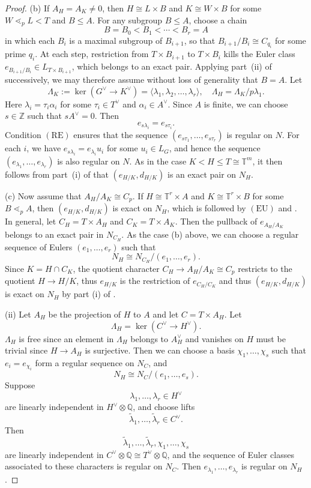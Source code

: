 \documentclass[10pt,a4paper]{amsart}
\newcommand{\bbT}{\mathbb T}
\newcommand{\lessdotp}{\mathrel{\lessdot_p}}
\begin{document}
\begin{proof}
  (b) If $A_H=A_K\neq 0$, then $H\cong L\times B$ and $K\cong  W\times B$ for some $W\lessdotp L< T$ and $B\leq A$. For any subgroup $B\leq A$, choose a chain
  \[
  B=B_0<B_1<\cdots<B_r=A
  \]
  in which each $B_i$ is a maximal subgroup of $B_{i+1}$, so that $B_{i+1}/B_i\cong C_{q_i}$ for some prime $q_i$. At each step, restriction from $T\times B_{i+1}$ to $T\times B_i$ kills the Euler class $e_{B_{i+1}/B_i}\in L_{T\times B_{i+1}}$, which belongs to an exact pair. Applying part~\textup{(ii)} of  successively, we may therefore assume without loss of generality that $B=A$. Let 
  $$\Lambda_{K}:=\ker (G^\vee \to {K}^\vee)=\langle \lambda_1,\lambda_2,\dots,\lambda_r\rangle, \quad \Lambda_{H}=\Lambda_{K}/p\lambda_1.$$ 
  Here $\lambda_i=\tau_i\alpha_i$ for some $\tau_i\in T^\vee$ and $\alpha_i\in A^\vee$. 
  Since $A$ is finite, we can choose $s\in \mathbb Z$ such that $s A^\vee=0$. Then $$e_{s\lambda_i}=e_{s\tau_i}.$$
  Condition $(\mathrm{RE})$ ensures that the sequence $(e_{s\tau_1},\dots,e_{s\tau_r})$ is regular on $N$. For each $i$, we have $e_{s\lambda_i}=e_{\lambda_i}u_i$ for some $u_i\in L_G$, and hence the sequence $(e_{\lambda_1},\dots,e_{\lambda_r})$ is also regular on $N$. As in the case $K<H\leq T\cong\bbT^m$, it then follows from part~\textup{(i)} of  that $(e_{H/K},d_{H/K})$ is an exact pair on $N_H$.

  (c) Now assume that $A_H/A_K\cong C_p$. If $H\cong \bbT^r\times A$ and $K\cong \bbT^r\times B$ for some $B\lessdotp A$, then $(e_{H/K},d_{H/K})$ is exact on $N_H$, which is followed by $(\mathrm{EU})$ and . In general, let $C_H=T\times A_H$ and $C_K=T\times A_K$. Then the pullback of $e_{A_H/A_K}$ belongs to an exact pair in $N_{C_H}$. As the case (b) above, we can choose a regular sequence of Eulers $(e_1,\dots,e_r)$ such that 
  \[
  N_H\cong N_{C_H}/(e_1,\dots, e_r).
  \]
  Since $K=H\cap C_K$, the quotient character $C_H \to A_H/A_K\cong C_p$ restricts to the quotient $H\to H/K$, thus $e_{H/K}$ is the restriction of $e_{C_H/C_K}$ and thus $(e_{H/K},d_{H/K})$ is exact on $N_H$ by part (i) of .

  (ii) Let $A_H$ be the projection of $H$ to $A$ and let $C=T\times A_H$. Let 
  \[
  \Lambda_H =\ker (C^\vee\to H^\vee).
  \]
  $\Lambda_H$ is free since an element in $\Lambda_H$ belongs to \(A_H^\vee\) and vanishes on $H$ must be trivial since $H\to A_H$ is surjective. Then we can choose a basis $\chi_1,\dots, \chi_s$ such that $e_i=e_{\chi_i}$ form a regular sequence on $N_C$, and 
  \[
  N_H \cong N_C/(e_1,\dots, e_s).
  \]
  Suppose
  \[
  \lambda_1,\ldots,\lambda_r\in H^\vee
  \]
  are linearly independent in \(H^\vee\otimes\mathbb Q\), and choose lifts
  \[
  \widetilde\lambda_1,\ldots,\widetilde\lambda_r\in C^\vee.
  \]
  Then
  \[
  \widetilde\lambda_1,\ldots,\widetilde\lambda_r, \chi_1,\ldots,\chi_s
  \]
  are linearly independent in $ C^\vee\otimes\mathbb Q\cong T^\vee\otimes\mathbb Q$, and the sequence of Euler classes associated to these characters is regular on $N_C$. Then $e_{\lambda_1}, \dots, e_{\lambda_r}$ is regular on $N_H$. 
\end{proof}
\end{document}
